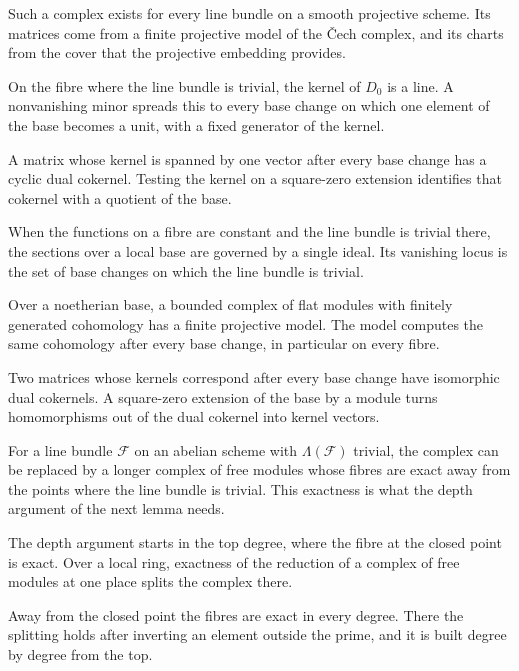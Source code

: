 Such a complex exists for every line bundle on a smooth projective scheme. Its matrices come from a finite projective
model of the \v{C}ech complex, and its charts from the cover that the projective embedding provides.

On the fibre where the line bundle is trivial, the kernel of $D_0$ is a line. A nonvanishing minor spreads this to
every base change on which one element of the base becomes a unit, with a fixed generator of the kernel.

A matrix whose kernel is spanned by one vector after every base change has a cyclic dual cokernel. Testing the
kernel on a square-zero extension identifies that cokernel with a quotient of the base.

When the functions on a fibre are constant and the line bundle is trivial there, the sections over a local base
are governed by a single ideal. Its vanishing locus is the set of base changes on which the line bundle is
trivial.

Over a noetherian base, a bounded complex of flat modules with finitely generated cohomology has a finite projective
model. The model computes the same cohomology after every base change, in particular on every fibre.

Two matrices whose kernels correspond after every base change have isomorphic dual cokernels. A square-zero
extension of the base by a module turns homomorphisms out of the dual cokernel into kernel vectors.

For a line bundle $\mathcal F$ on an abelian scheme with $\Lambda(\mathcal F)$ trivial, the complex can be replaced by a longer
complex of free modules whose fibres are exact away from the points where the line bundle is trivial. This
exactness is what the depth argument of the next lemma needs.

The depth argument starts in the top degree, where the fibre at the closed point is exact. Over a local ring,
exactness of the reduction of a complex of free modules at one place splits the complex there.

Away from the closed point the fibres are exact in every degree. There the splitting holds after inverting an
element outside the prime, and it is built degree by degree from the top.


